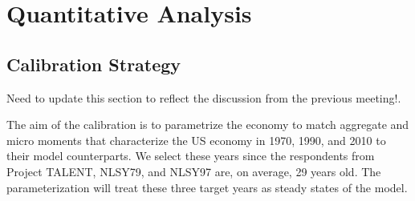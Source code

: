 \documentclass[onehalfspacing,11pt]{article}
\begin{document}
%
%
%
\section{Quantitative Analysis}\label{sec:quant}
\subsection{Calibration Strategy}\label{sec:calstrat}
{\sc Need to update this section to reflect the discussion from the previous meeting!.}

The aim of the calibration is to parametrize the economy to match aggregate and micro moments that characterize the US economy in 1970, 1990, and 2010 to their model counterparts. We select these years since the respondents from Project TALENT, NLSY79, and NLSY97 are, on average, 29 years old. The parameterization will treat these three target years as steady states of the model.
\end{document}
